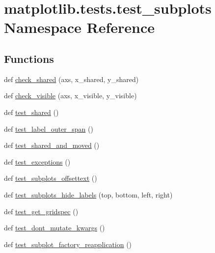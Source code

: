 \hypertarget{namespacematplotlib_1_1tests_1_1test__subplots}{}\section{matplotlib.\+tests.\+test\+\_\+subplots Namespace Reference}
\label{namespacematplotlib_1_1tests_1_1test__subplots}
\subsection*{Functions}
\begin{DoxyCompactItemize}
\item 
def \hyperlink{namespacematplotlib_1_1tests_1_1test__subplots_a661299a0348986664c158bbc5e8bdaf9}{check\+\_\+shared} (axs, x\+\_\+shared, y\+\_\+shared)
\item 
def \hyperlink{namespacematplotlib_1_1tests_1_1test__subplots_a14b8b004b84698b48efe4f190a284c81}{check\+\_\+visible} (axs, x\+\_\+visible, y\+\_\+visible)
\item 
def \hyperlink{namespacematplotlib_1_1tests_1_1test__subplots_ae70013f810d369ceed3143b08c3c6568}{test\+\_\+shared} ()
\item 
def \hyperlink{namespacematplotlib_1_1tests_1_1test__subplots_ae9322d8aa30743d6fa37915811c38099}{test\+\_\+label\+\_\+outer\+\_\+span} ()
\item 
def \hyperlink{namespacematplotlib_1_1tests_1_1test__subplots_a3a24310526eb32b0a94eb21f5af8b9cb}{test\+\_\+shared\+\_\+and\+\_\+moved} ()
\item 
def \hyperlink{namespacematplotlib_1_1tests_1_1test__subplots_a12891a64584198d8af98341dfdb37380}{test\+\_\+exceptions} ()
\item 
def \hyperlink{namespacematplotlib_1_1tests_1_1test__subplots_a5ae3b47558869717a35047947bb15059}{test\+\_\+subplots\+\_\+offsettext} ()
\item 
def \hyperlink{namespacematplotlib_1_1tests_1_1test__subplots_ad8d239d785e5e98c233505ae16167c28}{test\+\_\+subplots\+\_\+hide\+\_\+labels} (top, bottom, left, right)
\item 
def \hyperlink{namespacematplotlib_1_1tests_1_1test__subplots_a075eaea12b6934af835aef053f5ee108}{test\+\_\+get\+\_\+gridspec} ()
\item 
def \hyperlink{namespacematplotlib_1_1tests_1_1test__subplots_a1c2e39f5cd23da91af6e8fcaede1bd34}{test\+\_\+dont\+\_\+mutate\+\_\+kwargs} ()
\item 
def \hyperlink{namespacematplotlib_1_1tests_1_1test__subplots_a6abe6bcf67d385515312bcb50e079c2d}{test\+\_\+subplot\+\_\+factory\+\_\+reapplication} ()
\end{DoxyCompactItemize}


